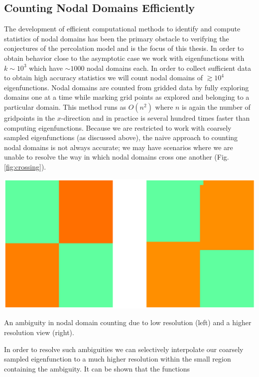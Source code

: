 \documentclass[english]{article}
\makeatletter
\newenvironment{figurehere}
{\def\@captype{figure}}
{}
\makeatother
\begin{document}
\begin{multicols}{2}
\subsection*{Counting Nodal Domains Efficiently}
The development of efficient computational methods to identify and compute statistics of nodal domains has been the primary obstacle to verifying the conjectures of the percolation model and is the focus of this thesis. In order to obtain behavior close to the asymptotic case we work with eigenfunctions with $k \sim 10^{3}$ which have $\sim 1000$ nodal domains each. In order to collect sufficient data to obtain high accuracy statistics we will count nodal domains of $\gtrsim 10^{4}$ eigenfunctions. Nodal domains are counted from gridded data by fully exploring domains one at a time while marking grid points as explored and belonging to a particular domain. This method runs as $O\left(n^{2}\right)$ where $n$ is again the number of gridpoints in the $x$-direction and in practice is several hundred times faster than computing eigenfunctions. Because we are restricted to work with coarsely sampled eigenfunctions (as discussed above), the naive approach to counting nodal domains is not always accurate; we may have scenarios where we are unable to resolve the way in which nodal domains cross one another (Fig. \ref{fig:crossing}).

\begin{figurehere}
\centering
\includegraphics[width=\columnwidth]{crossing.eps}
\vspace{-30pt}
\caption{An ambiguity in nodal domain counting due to low resolution (left) and a higher resolution view (right).}
\vspace{10pt}
\label{fig:crossing}
\end{figurehere}

In order to resolve such ambiguities we can selectively interpolate our coarsely sampled eigenfunction to a much higher resolution within the small region containing the ambiguity. It can be shown that the functions


\end{multicols}
\end{document}
